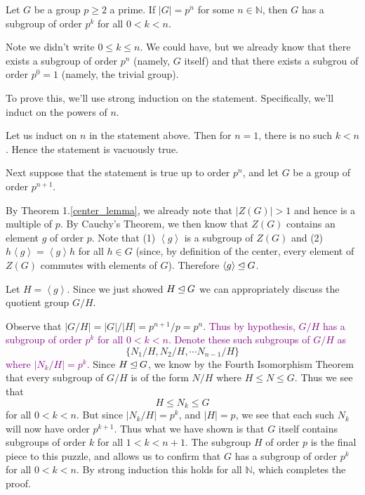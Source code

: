     \begin{thm}
        Let $G$ be a group $p \ge 2$ a prime. If $|G| = p^n$ for some
        $n \in \mathbb{N}$, then $G$ has a subgroup of order $p^k$ for
        all $0 < k < n$.
    \end{thm}
    Note we didn't write $ 0 \le k \le n$. We could have, but we already
        know that there exists a subgroup of order $p^n$ (namely, $G$
        itself) and that there exists a subgrou of order $p^0 = 1$
        (namely, the trivial group).
    \begin{prf}
        \textcolor{NavyBlue}{To prove this, we'll use strong induction
        on the statement. Specifically, we'll induct on the powers of
        $n$.}

        Let us induct on $n$ in the statement above. Then for $n = 1$,
        there is no such $k < n$. Hence the statement is vacuously
        true. 

        Next suppose that the statement is true up to order $p^n$, 
        and let $G$ be a group of order $p^{n+1}$. 

        By Theorem 1.\ref{center_lemma}, we already note that $|Z(G)| >
        1$ and hence is a multiple of $p$. By Cauchy's Theorem, we
        then know that $Z(G)$ contains an element $g$ of order $p$.
        Note that (1) $\left< g\right>$ is a subgroup of $Z(G)$ and
        (2) $h\left< g \right> = \left< g \right>h$ for all $h \in G$
        (since, by definition of the center, every element of $Z(G)$
        commutes with elements of $G$). Therefore $\left< g \right>
        \unlhd G$. 

        Let $H = \left< g \right>$. Since we just showed $H \unlhd G$
        we can appropriately discuss the quotient group $G/H$.

        Observe that $|G/H| = |G|/|H| = p^{n+1}/p = p^n$. \textcolor{purple}{Thus by hypothesis, $G/H$ has a
        subgroup of order $p^k$ for all $0 < k < n$. Denote these such
        subgroups of $G/H$ as}
        \[
            \{N_1/H, N_2/H, \cdots N_{n-1}/H\}
        \]
        \textcolor{purple}{where $|N_k/H| = p^k$.}
        Since $H \unlhd G$, we
        know by the Fourth Isomorphism Theorem that every subgroup of
        $G/H$ is of the form $N/H$ where $H \le N \le G$. Thus we see
        that 
        \[
            H \le N_k \le G
        \]
        for all $0 < k < n$. But since $|N_k/H| = p^k$, and $|H| = p$,
        we see that each such $N_k$ will now have order $p^{k+1}$.
        Thus what we have shown is that $G$ itself contains subgroups
        of order $k$ for all $1 < k < n+1$. The subgroup $H$ of order
        $p$ is the final piece to this puzzle, and allows us to
        confirm that $G$ has a subgroup of order $p^k$ for all $0 < k < n$.
        By strong induction this holds for all $\mathbb{N}$,
        which completes the proof.
    \end{prf}



